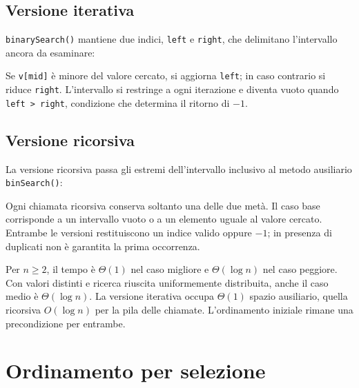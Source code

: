 \subsection{Versione iterativa}
\label{sec:fi-java-alg-binaria-iterativa}

\texttt{binarySearch()} mantiene due indici, \texttt{left} e
\texttt{right}, che delimitano l'intervallo ancora da esaminare:

\noindent
\begin{minipage}{\linewidth}

\end{minipage}

Se \texttt{v[mid]} è minore del valore cercato, si aggiorna
\texttt{left}; in caso contrario si riduce \texttt{right}.
L'intervallo si restringe a ogni iterazione e diventa vuoto
quando \lstinline|left > right|, condizione che determina il ritorno
di \(-1\).

\subsection{Versione ricorsiva}
\label{sec:fi-java-alg-binaria-ricorsiva}

La versione ricorsiva passa gli estremi dell'intervallo inclusivo
al metodo ausiliario \texttt{binSearch()}:

\noindent
\begin{minipage}{\linewidth}

\end{minipage}

Ogni chiamata ricorsiva conserva soltanto una delle due metà.
Il caso base corrisponde a un intervallo vuoto o a un elemento
uguale al valore cercato. Entrambe le versioni restituiscono
un indice valido oppure \(-1\); in presenza di duplicati non
è garantita la prima occorrenza.

Per \(n\ge2\), il tempo è \(\Theta(1)\) nel caso migliore e
\(\Theta(\log n)\) nel caso peggiore. Con valori distinti e ricerca
riuscita uniformemente distribuita, anche il caso medio è
\(\Theta(\log n)\). La versione iterativa occupa
\(\Theta(1)\) spazio ausiliario, quella ricorsiva
\(O(\log n)\) per la pila delle chiamate. L'ordinamento iniziale
rimane una precondizione per entrambe.

\section{Ordinamento per selezione}
\label{sec:fi-java-alg-selezione}

